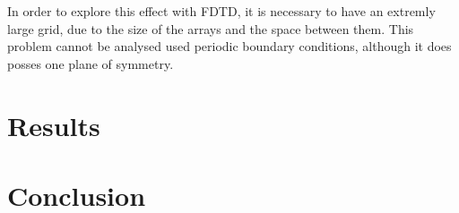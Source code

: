 \documentclass{acesconference}
\begin{document}
In order to explore this effect with FDTD, it is necessary to have
an extremly large grid, due to the size of the arrays and the space
between them. This problem cannot be analysed used periodic boundary
conditions, although it does posses one plane of symmetry. 

\section{Results}

\section{Conclusion}




%
\end{document}

